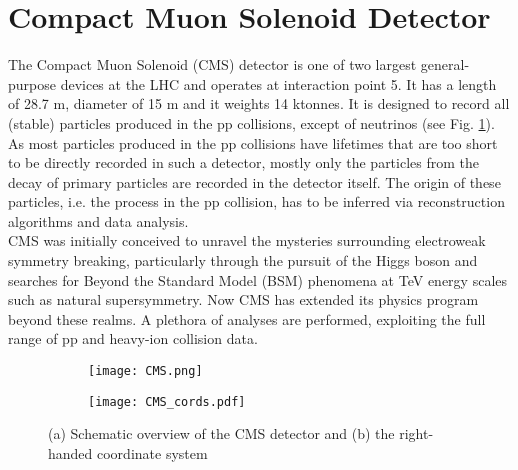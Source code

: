 


\section{\label{sec:exp_CMS}Compact Muon Solenoid Detector}
\noindent The Compact Muon Solenoid (CMS) detector is one of two largest general-purpose devices at the LHC and operates at interaction point 5. It has a length of 28.7 m, diameter of 15 m and it weights 14 ktonnes. It is designed to record all (stable) particles produced in the pp collisions, except of neutrinos (see Fig. \ref{fig:CMS}). As most particles produced in the pp collisions have lifetimes that are too short to be directly recorded in such a detector, mostly only the particles from the decay of primary particles are recorded in the detector itself. The origin of these particles, i.e. the process in the pp collision, has to be inferred via reconstruction algorithms and data analysis.\\
\indent CMS was initially conceived to unravel the mysteries surrounding electroweak symmetry breaking, particularly through the pursuit of the Higgs boson and searches for Beyond the Standard Model (BSM) phenomena at TeV energy scales such as natural supersymmetry. Now CMS has extended its physics program beyond these realms. A plethora of analyses are performed, exploiting the full range of pp and heavy-ion collision data.
\begin{figure}[H]
  \centering
  \begin{subfigure}{0.76\textwidth}
    \centering
    \texttt{[image: CMS.png]}
     \caption{}
    \label{fig:CMS}
  \end{subfigure}
  \hfill
  \begin{subfigure}{0.23\textwidth}
    \centering
    \texttt{[image: CMS\_cords.pdf]}
     \caption{}
    \label{fig:CMS_Cords}
  \end{subfigure}
  \caption{(a) Schematic overview of the CMS detector \cite{CMS_sketch} and (b) the right-handed coordinate system \cite{CMS_cords}}
  \label{fig:CMS and cords}
\end{figure}


